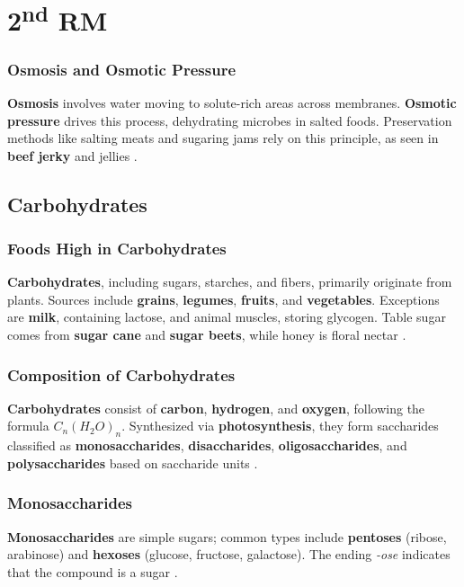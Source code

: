\section{2\texorpdfstring{\textsuperscript{nd}}{nd} RM}
\subsubsection*{Osmosis and Osmotic Pressure}
\textbf{Osmosis} involves water moving to solute-rich areas across membranes. \textbf{Osmotic pressure} drives this process, dehydrating microbes in salted foods. Preservation methods like salting meats and sugaring jams rely on this principle, as seen in \textbf{beef jerky} and jellies \cite*{BKR_02}.

\subsection{Carbohydrates}
\subsubsection*{Foods High in Carbohydrates}
\textbf{Carbohydrates}, including sugars, starches, and fibers, primarily originate from plants. Sources include \textbf{grains}, \textbf{legumes}, \textbf{fruits}, and \textbf{vegetables}. Exceptions are \textbf{milk}, containing lactose, and animal muscles, storing glycogen. Table sugar comes from \textbf{sugar cane} and \textbf{sugar beets}, while honey is floral nectar \cite*{BKR_02}.

\subsubsection*{Composition of Carbohydrates}
\textbf{Carbohydrates} consist of \textbf{carbon}, \textbf{hydrogen}, and \textbf{oxygen}, following the formula $C_n(H_2O)_n$. Synthesized via \textbf{photosynthesis}, they form saccharides classified as \textbf{monosaccharides}, \textbf{disaccharides}, \textbf{oligosaccharides}, and \textbf{polysaccharides} based on saccharide units \cite*{BKR_02}.

\subsubsection*{Monosaccharides}
\textbf{Monosaccharides} are simple sugars; common types include \textbf{pentoses} (ribose, arabinose) and \textbf{hexoses} (glucose, fructose, galactose). The ending \textit{-ose} indicates that the compound is a sugar \cite*{BKR_02}.

